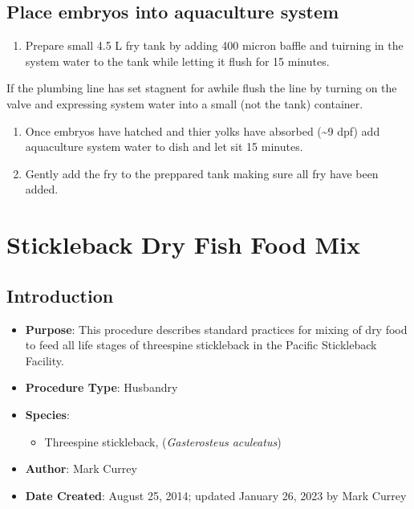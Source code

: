 \documentclass[
  letterpaper,
  DIV=11,
  numbers=noendperiod]{scrreprt}
\providecommand{\tightlist}{%
  \setlength{\itemsep}{0pt}\setlength{\parskip}{0pt}}\usepackage{longtable,booktabs,array}
\begin{document}
\hypertarget{place-embryos-into-aquaculture-system}{%
\section{Place embryos into aquaculture
system}\label{place-embryos-into-aquaculture-system}}

\begin{enumerate}
\def\labelenumi{\arabic{enumi}.}
\setcounter{enumi}{28}
\tightlist
\item
  Prepare small 4.5 L fry tank by adding 400 micron baffle and tuirning
  in the system water to the tank while letting it flush for 15 minutes.
\end{enumerate}

If the plumbing line has set stagnent for awhile flush the line by
turning on the valve and expressing system water into a small (not the
tank) container.

\begin{enumerate}
\def\labelenumi{\arabic{enumi}.}
\setcounter{enumi}{29}
\tightlist
\item
  Once embryos have hatched and thier yolks have absorbed
  (\textasciitilde9 dpf) add aquaculture system water to dish and let
  sit 15 minutes.
\item
  Gently add the fry to the preppared tank making sure all fry have been
  added.
\end{enumerate}

\hypertarget{sec-recipe-dry_fish_food}{%
\chapter{Stickleback Dry Fish Food Mix}\label{sec-recipe-dry_fish_food}}

\hypertarget{introduction-28}{%
\section{Introduction}\label{introduction-28}}

\begin{itemize}
\tightlist
\item
  \textbf{Purpose}: This procedure describes standard practices for
  mixing of dry food to feed all life stages of threespine stickleback
  in the Pacific Stickleback Facility.
\item
  \textbf{Procedure Type}: Husbandry
\item
  \textbf{Species}:

  \begin{itemize}
  \tightlist
  \item
    Threespine stickleback, (\emph{Gasterosteus aculeatus})
  \end{itemize}
\item
  \textbf{Author}: Mark Currey
\item
  \textbf{Date Created}: August 25, 2014; updated January 26, 2023 by
  Mark Currey
\end{itemize}
\end{document}
